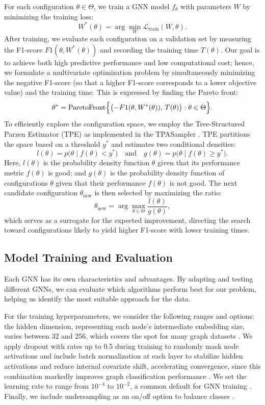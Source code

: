 \documentclass[journal]{IEEEtran}
\begin{document}
For each configuration $\theta \in \Theta$, we train a GNN model $f_\theta$ with parameters $W$ by minimizing the training loss:
\[
W^*(\theta)=\arg\min_{W}\mathcal{L}_{\text{train}}(W,\theta).
\]
After training, we evaluate each configuration on a validation set by measuring the F1-score $F1(\theta,W^*(\theta))$ and recording the training time $T(\theta)$. Our goal is to achieve both high predictive performance and low computational cost; hence, we formulate a multivariate optimization problem by simultaneously minimizing the negative F1-score (so that a higher F1-score corresponds to a lower objective value) and the training time. This is expressed by finding the Pareto front:
\[
\theta^*=\operatorname{ParetoFront}\Bigl\{ \bigl(-F1(\theta,W^*(\theta)),\,T(\theta)\bigr) : \theta\in\Theta\Bigr\}.
\]
To efficiently explore the configuration space, we employ the Tree-Structured Parzen Estimator (TPE) as implemented in the TPASampler \cite{joy2022comprehensive}. TPE partitions the space based on a threshold $y^*$ and estimates two conditional densities:
\[
l(\theta)=p\bigl(\theta\mid f(\theta)<y^*\bigr) \quad \text{and} \quad g(\theta)=p\bigl(\theta\mid f(\theta)\ge y^*\bigr).
\]
Here, $l(\theta)$ is the probability density function $\theta$ given that its performance metric $f(\theta)$ is good; and $g(\theta)$ is the probability density function of configurations $\theta$ given that their performance $f(\theta)$ is not good. The next candidate configuration $\theta_{\text{new}}$ is then selected by maximizing the ratio:
\[
\theta_{\text{new}}=\arg\max_{\theta\in\Theta}\frac{l(\theta)}{g(\theta)},
\]
which serves as a surrogate for the expected improvement, directing the search toward configurations likely to yield higher F1-score with lower training times.




\subsection{Model Training and Evaluation} \label{sec:model_training_eval}

Each GNN has its own characteristics and advantages. By adapting and testing different GNNs, we can evaluate which algorithms perform best for our problem, helping us identify the most suitable approach for the data. 

For the training hyperparameters, we consider the following ranges and options: the hidden dimension, representing each node’s intermediate embedding size, varies between 32 and 256, which covers the spot for many graph datasets \cite{song2021network}. We apply dropout with rates up to 0.5 during training to randomly mask node activations and include batch normalization at each layer to stabilize hidden activations and reduce internal covariate shift, accelerating convergence, since this combination markedly improves graph classification performance \cite{luobeyond}. We set the learning rate to range from $10^{-4}$ to $10^{-2}$, a common default for GNN training \cite{gu2025neubm}. Finally, we include undersampling as an on/off option to balance classes \cite{ma2025class}.
\end{document}
